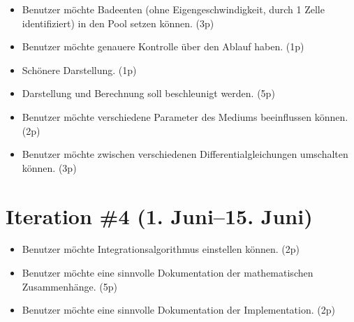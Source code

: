 \documentclass[11pt]{scrreprt} %
\theoremstyle{definition}
\begin{document}
\begin{appendix}
\begin{itemize}
\item Benutzer möchte Badeenten (ohne Eigengeschwindigkeit, durch 1 Zelle identifiziert) in den Pool setzen können. (3p) 
\item Benutzer möchte genauere Kontrolle über den Ablauf haben. (1p) 
\item Schönere Darstellung. (1p) 
\item Darstellung und Berechnung soll beschleunigt werden. (5p)
\item Benutzer möchte verschiedene Parameter des Mediums beeinflussen können. (2p) 
\item Benutzer möchte zwischen verschiedenen Differentialgleichungen umschalten können. (3p)
\end{itemize}


\section{Iteration \#4 (1. Juni--15. Juni)}

\begin{itemize}
\item Benutzer möchte Integrationsalgorithmus einstellen können. (2p) 
\item Benutzer möchte eine sinnvolle Dokumentation der mathematischen Zusammenhänge. (5p)
\item Benutzer möchte eine sinnvolle Dokumentation der Implementation. (2p)
\end{itemize}

\end{appendix}
\end{document}
